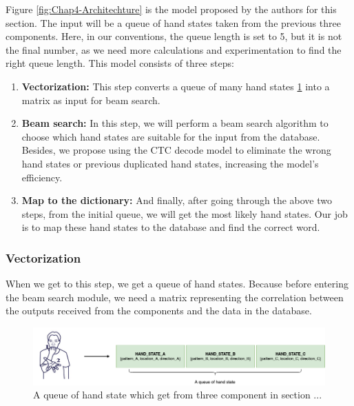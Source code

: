 Figure \ref{fig:Chap4-Architechture} is the model proposed by the authors for this section. The input will be a queue of hand states taken from the previous three components. Here, in our conventions, the queue length is set to 5, but it is not the final number, as we need more calculations and experimentation to find the right queue length. This model consists of three steps:

\begin{enumerate}
  \item \textbf{Vectorization:} This step converts a queue of many hand states \ref{fig:Chap4-HandStateQueue} into a matrix as input for beam search.
  \item \textbf{Beam search:} In this step, we will perform a beam search algorithm to choose which hand states are suitable for the input from the database. Besides, we propose using the CTC decode model to eliminate the wrong hand states or previous duplicated hand states, increasing the model's efficiency.
  \item \textbf{Map to the dictionary:} And finally, after going through the above two steps, from the initial queue, we will get the most likely hand states. Our job is to map these hand states to the database and find the correct word.
\end{enumerate}
      
\subsubsection{ Vectorization }

When we get to this step, we get a queue of hand states. Because before entering the beam search module, we need a matrix representing the correlation between the outputs received from the components and the data in the database.

\begin{figure}[H]
  \centering
  \includegraphics[width=\textwidth]{img/Chap4/HandStateQueue.png}
  \caption{A queue of hand state which get from three component in section ... }
  \label{fig:Chap4-HandStateQueue}
\end{figure}

